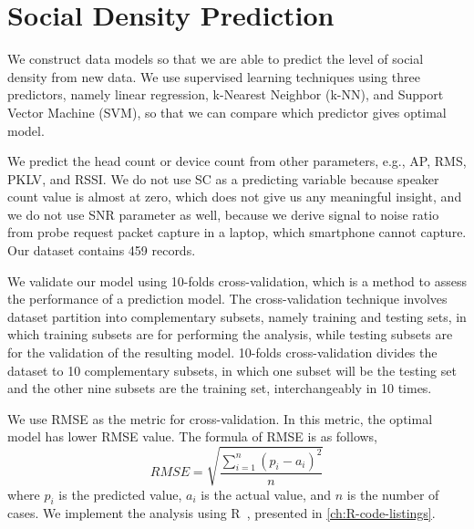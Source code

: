 

\section{Social Density Prediction} %
\label{sec:social-density-prediction}
We construct data models so that we are able to predict the level of social density from new data. We use supervised learning techniques using three predictors, namely linear regression, k-Nearest Neighbor (\ac{k-NN}), and Support Vector Machine (\ac{SVM}), so that we can compare which predictor gives optimal model.

We predict the head count or device count from other parameters, e.g., \ac{AP}, \ac{RMS}, \ac{PKLV}, and \ac{RSSI}. We do not use \ac{SC} as a predicting variable because speaker count value is almost at zero, which does not give us any meaningful insight, and we do not use \ac{SNR} parameter as well, because we derive signal to noise ratio from probe request packet capture in a laptop, which smartphone cannot capture. Our dataset contains 459 records.

We validate our model using 10-folds cross-validation, which is a method to assess the performance of a prediction model. The cross-validation technique involves dataset partition into complementary subsets, namely training and testing sets, in which training subsets are for performing the analysis, while testing subsets are for the validation of the resulting model. 10-folds cross-validation divides the dataset to 10 complementary subsets, in which one subset will be the testing set and the other nine subsets are the training set, interchangeably in 10 times.

We use \ac{RMSE} as the metric for cross-validation. In this metric, the optimal model has lower \ac{RMSE} value. The formula of \ac{RMSE} is as follows,
\begin{equation} \label{eq:rmse}
 RMSE=\sqrt { \frac { \sum _{ i=1 }^{ n }{ { \left( { p }_{ i }-{ a }_{ i } \right)  }^{ 2 } }  }{ n }  } 
\end{equation}
where ${ p }_{ i }$ is the predicted value, ${ a }_{ i }$ is the actual value, and $n$ is the number of cases. We implement the analysis using R~\cite{r-team}, presented in \autoref{ch:R-code-listings}.


